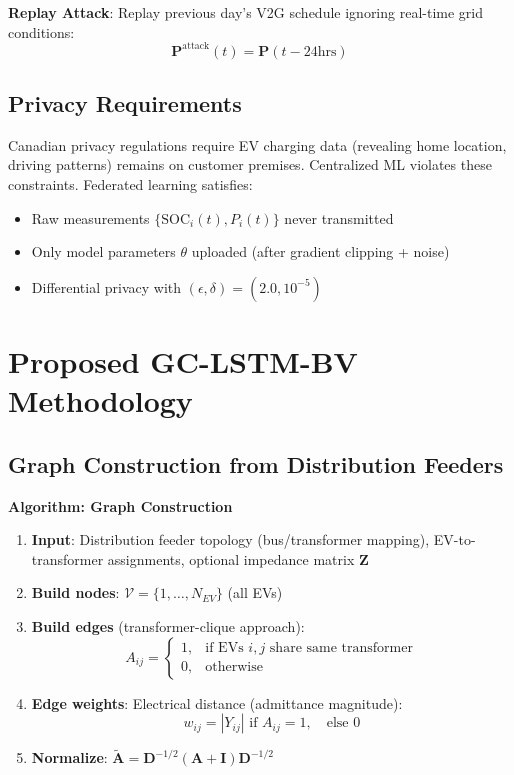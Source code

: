 \documentclass[journal]{IEEEtran}
\begin{document}
\textbf{Replay Attack}: Replay previous day's V2G schedule ignoring real-time grid conditions:
\begin{equation}
\mathbf{P}^{\text{attack}}(t) = \mathbf{P}(t - 24\text{hrs})
\end{equation}

\subsection{Privacy Requirements}

Canadian privacy regulations require EV charging data (revealing home location, driving patterns) remains on customer premises. Centralized ML violates these constraints. Federated learning satisfies:
\begin{itemize}
    \item Raw measurements $\{\text{SOC}_i(t), P_i(t)\}$ never transmitted
    \item Only model parameters $\theta$ uploaded (after gradient clipping + noise)
    \item Differential privacy with $(\epsilon, \delta) = (2.0, 10^{-5})$
\end{itemize}

\section{Proposed GC-LSTM-BV Methodology}

\subsection{Graph Construction from Distribution Feeders}
\label{sec:graph}

\textbf{Algorithm: Graph Construction}
\begin{enumerate}
    \item \textbf{Input}: Distribution feeder topology (bus/transformer mapping), EV-to-transformer assignments, optional impedance matrix $\mathbf{Z}$
    \item \textbf{Build nodes}: $\mathcal{V} = \{1, \ldots, N_{EV}\}$ (all EVs)
    \item \textbf{Build edges} (transformer-clique approach):
    \begin{equation}
    A_{ij} = \begin{cases}
    1, & \text{if EVs $i,j$ share same transformer} \\
    0, & \text{otherwise}
    \end{cases}
    \end{equation}
    \item \textbf{Edge weights}: Electrical distance (admittance magnitude):
    \begin{equation}
    w_{ij} = |Y_{ij}| \text{ if } A_{ij}=1, \quad \text{else } 0
    \end{equation}
    \item \textbf{Normalize}: $\tilde{\mathbf{A}} = \mathbf{D}^{-1/2} (\mathbf{A} + \mathbf{I}) \mathbf{D}^{-1/2}$
\end{enumerate}
\end{document}
